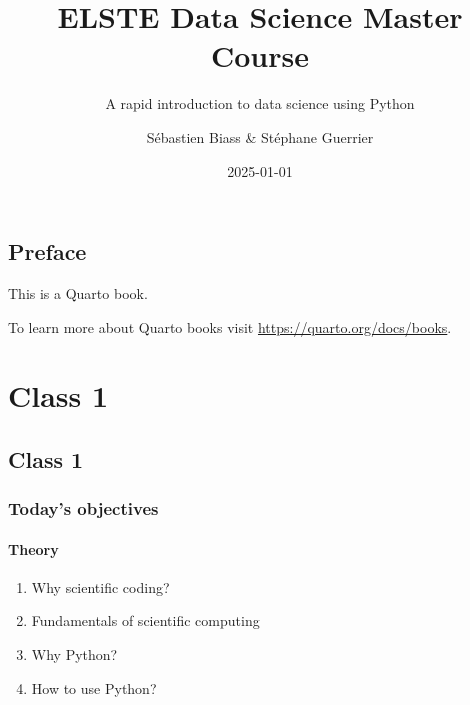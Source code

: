 \documentclass[
  letterpaper,
  DIV=11,
  numbers=noendperiod]{scrreprt}
\title{ELSTE Data Science Master Course}
\subtitle{A rapid introduction to data science using Python}
\author{Sébastien Biass \& Stéphane Guerrier}
\date{2025-01-01}
\providecommand{\tightlist}{%
  \setlength{\itemsep}{0pt}\setlength{\parskip}{0pt}}\usepackage{longtable,booktabs,array}
\renewcommand*\contentsname{Table of contents}
\newcommand\contentsname{Table of contents}
\begin{document}
\maketitle

\renewcommand*\contentsname{Table of contents}
{
\hypersetup{linkcolor=}
\setcounter{tocdepth}{2}
\tableofcontents
}


\chapter*{Preface}\label{preface}


This is a Quarto book.

To learn more about Quarto books visit
\url{https://quarto.org/docs/books}.

\part{Class 1}

\chapter*{Class 1}\label{class-1-1}


\section*{Today's objectives}\label{todays-objectives}


\subsection*{Theory}\label{theory}

\begin{enumerate}
\def\labelenumi{\arabic{enumi}.}
\tightlist
\item
  Why scientific coding?
\item
  Fundamentals of scientific computing
\item
  Why Python?
\item
  How to use Python?
\end{enumerate}
\end{document}

